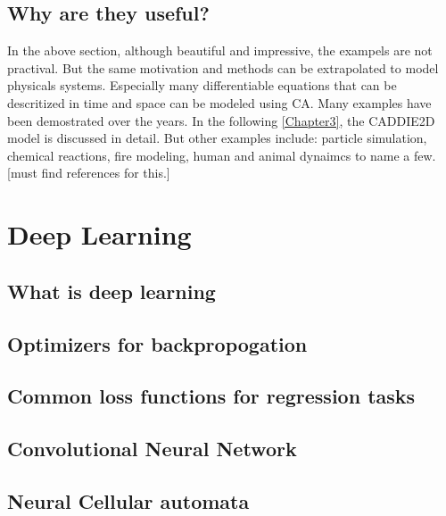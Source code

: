 \subsection{Why are they useful?}
In the above section, although beautiful and impressive, the exampels are not practival. But the same motivation and methods can be extrapolated to model physicals systems. Especially many differentiable equations that can be descritized in time and space can be modeled using CA. Many examples have been demostrated over the years. In the following \ref{Chapter3}, the CADDIE2D model is discussed in detail. But other examples include: particle simulation, chemical reactions, fire modeling, human and animal dynaimcs to name a few. [must find references for this.]

\section{Deep Learning}
\subsection{What is deep learning}
\subsection{Optimizers for backpropogation}
\subsection{Common loss functions for regression tasks}
\subsection{Convolutional Neural Network}
\subsection{Neural Cellular automata}
